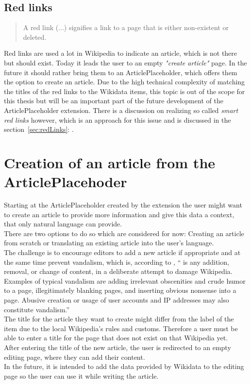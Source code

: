 \subsection{Red links}
\begin{quotation}
A red link (...) signifies a link to a page that is either non-existent or deleted. 
\end{quotation} \citep{wiki:01}

Red links are used a lot in Wikipedia to indicate an article, which is not there but should exist. Today it leads the user to an empty \textit{"create article"} page. In the future it should rather bring them to an ArticlePlaceholder, which offers them the option to create an article. Due to the high technical complexity of matching the titles of the red links to the Wikidata items, this topic is out of the scope for this thesis but will be an important part of the future development of the ArticlePlaceholder extension. There is a discussion on realizing so called \textit{smart red links} however, which is an approach for this issue and is discussed in the section~\ref{sec:redLinks}: .

\section{Creation of an article from the ArticlePlacehoder}
Starting at the ArticlePlaceholder created by the extension the user might want to create an article to provide more information and give this data a context, that only natural language can provide. \\
There are two options to do so which are considered for now: Creating an article from scratch or translating an existing article into the user's language. \\
The challenge is to encourage editors to add a new article if appropriate and at the same time prevent vandalism, which is, according to \citet{wiki:33}, `` is any addition, removal, or change of content, in a deliberate attempt to damage Wikipedia. Examples of typical vandalism are adding irrelevant obscenities and crude humor to a page, illegitimately blanking pages, and inserting obvious nonsense into a page. Abusive creation or usage of user accounts and IP addresses may also constitute vandalism.'' \\ 
The title for the article they want to create might differ from the label of the item due to the local Wikipedia's rules and customs. Therefore a user must be able to enter a title for the page that does not exist on that Wikipedia yet. \\
After entering the title of the new article, the user is redirected to an empty editing page, where they can add their content. \\
In the future, it is intended to add the data provided by Wikidata to the editing page so the user can use it while writing the article. 

